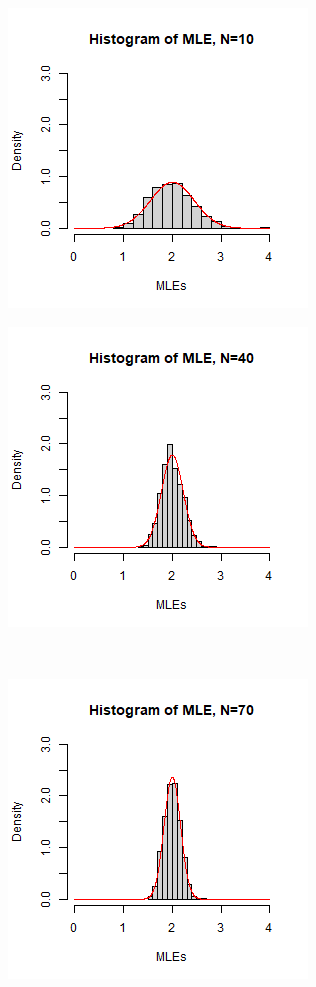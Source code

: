 \begin{figure}[h]
    \centering
    \begin{subfigure}
        \centering
        \includegraphics[scale=0.6]{../../../misc/N10.jpg}
    \end{subfigure}
    \begin{subfigure}
        \centering
        \includegraphics[scale=0.6]{../../../misc/N40.jpg}
    \end{subfigure}\\
    \begin{subfigure}
        \centering
        \includegraphics[scale=0.6]{../../../misc/N70.jpg}

\end{subfigure}
\end{figure}
